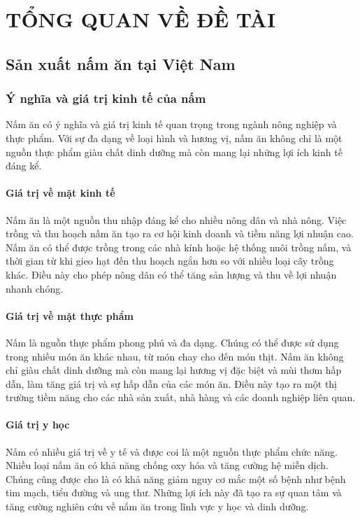 \chapter{TỔNG QUAN VỀ ĐỀ TÀI}

\section{Sản xuất nấm ăn tại Việt Nam}

\subsection{Ý nghĩa và giá trị kinh tế của nấm}

Nấm ăn có ý nghĩa và giá trị kinh tế quan trọng trong ngành nông nghiệp và thực phẩm. Với sự đa dạng về loại hình và hương vị, nấm ăn không chỉ là một nguồn thực phẩm giàu chất dinh dưỡng mà còn mang lại những lợi ích kinh tế đáng kể.

\subsubsection{Giá trị về mặt kinh tế}
Nấm ăn là một nguồn thu nhập đáng kể cho nhiều nông dân và nhà nông. Việc trồng và thu hoạch nấm ăn tạo ra cơ hội kinh doanh và tiềm năng lợi nhuận cao. Nấm ăn có thể được trồng trong các nhà kính hoặc hệ thống nuôi trồng nấm, và thời gian từ khi gieo hạt đến thu hoạch ngắn hơn so với nhiều loại cây trồng khác. Điều này cho phép nông dân có thể tăng sản lượng và thu về lợi nhuận nhanh chóng.

\subsubsection{Giá trị về mặt thực phẩm}
Nấm là nguồn thực phẩm phong phú và đa dạng. Chúng có thể được sử dụng trong nhiều món ăn khác nhau, từ món chay cho đến món thịt. Nấm ăn không chỉ giàu chất dinh dưỡng mà còn mang lại hương vị đặc biệt và mùi thơm hấp dẫn, làm tăng giá trị và sự hấp dẫn của các món ăn. Điều này tạo ra một thị trường tiềm năng cho các nhà sản xuất, nhà hàng và các doanh nghiệp liên quan.

\subsubsection{Giá trị y học}
Nấm có nhiều giá trị về y tế và được coi là một nguồn thực phẩm chức năng. Nhiều loại nấm ăn có khả năng chống oxy hóa và tăng cường hệ miễn dịch. Chúng cũng được cho là có khả năng giảm nguy cơ mắc một số bệnh như bệnh tim mạch, tiểu đường và ung thư. Những lợi ích này đã tạo ra sự quan tâm và tăng cường nghiên cứu về nấm ăn trong lĩnh vực y học và dinh dưỡng.

